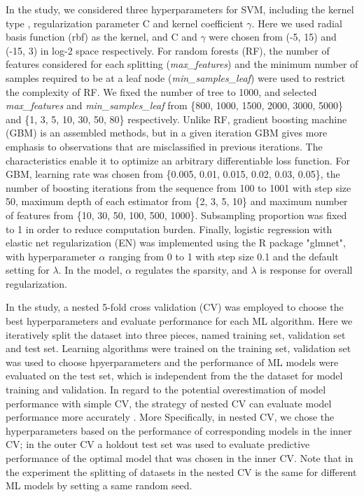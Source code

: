       In the study, we considered three hyperparameters for SVM, including the kernel type , regularization parameter C and kernel coefficient $\gamma$. Here we used radial basis function (rbf) as the kernel, and C and $\gamma$ were chosen from (-5, 15) and (-15, 3) in log-2 space respectively. For random forests (RF), the number of features considered for each splitting (\textit{max\_features}) and the minimum number of samples required to be at a leaf node (\textit{min\_samples\_leaf}) were used to restrict the complexity of RF. We fixed the number of tree to 1000, and selected \textit{max\_features} and \textit{min\_samples\_leaf} from \{800, 1000, 1500, 2000, 3000, 5000\} and \{1, 3, 5, 10, 30, 50, 80\} respectively. Unlike RF, gradient boosting machine (GBM) is an assembled methods, but in a given iteration GBM gives more emphasis to observations that are misclassified in previous iterations. The characteristics enable it to optimize an arbitrary differentiable loss function. For GBM, learning rate was chosen from \{0.005, 0.01, 0.015, 0.02, 0.03, 0.05\}, the number of boosting iterations from the sequence from 100 to 1001 with step size 50, maximum depth of each estimator from \{2, 3, 5, 10\} and maximum number of features from \{10, 30, 50, 100, 500, 1000\}. Subsampling proportion was fixed to 1 in order to reduce computation burden. Finally, logistic regression with elastic net regularization (EN) was implemented using the R package "glmnet", with hyperparameter $\alpha$ ranging from 0 to 1 with step size 0.1 and the default setting for $\lambda$. In the model, $\alpha$ regulates the sparsity, and $\lambda$ is response for overall regularization. 
  
      In the study, a nested 5-fold cross validation (CV) was employed to choose the best hyperparameters and evaluate performance for each ML algorithm. Here we iteratively split the dataset into three pieces, named training set, validation set and test set. Learning algorithms were trained on the training set, validation set was used to choose hpyerparameters and the performance of ML models were evaluated on the test set, which is independent from the the dataset for model training and validation. In regard to the potential overestimation of model performance with simple CV, the strategy of nested CV can evaluate model performance more accurately \cite{varma2006bias}. More Specifically, in nested CV, we chose the hyperparameters based on the performance of corresponding models in the inner CV; in the outer CV a holdout test set was used to evaluate predictive performance of the optimal model that was chosen in the inner CV. Note that in the experiment the splitting of datasets in the nested CV is the same for different ML models by setting a same random seed. 
  

